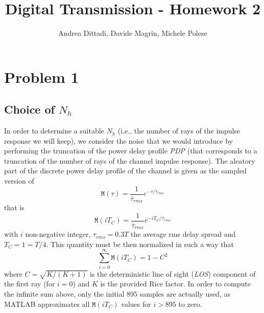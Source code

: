 \documentclass[10pt]{article}
\newcommand{\M} {\mathtt{M}}
\begin{document}
\title{Digital Transmission - Homework 2}
\author{Andrea Dittadi, Davide Magrin, Michele Polese}

\maketitle

\section*{Problem 1}

\subsection*{Choice of $N_h$}

In order to determine a suitable $N_h$ (i.e., the number of rays of the impulse response we will keep), we consider the noise that we would introduce by performing the truncation of the power delay profile \textit{PDP} (that corresponds to a truncation of the number of rays of the channel impulse response). The aleatory part of the discrete power delay profile of the channel is given as the sampled version of
\begin{equation}
\M(\tau) = \frac{1}{\bar{\tau}_{rms}} e^{-\tau / \bar{\tau}_{rms}}
\end{equation}
that is
\begin{equation}
\M(iT_C) = \frac{1}{\bar{\tau}_{rms}} e^{-iT_C / \bar{\tau}_{rms}}
\end{equation}
with $i$ non-negative integer, $\tau_{rms} = 0.3T$ the average rms delay spread and $T_C = 1 = T/4$. This quantity must be then normalized in such a way that
\begin{equation}
\sum_{i=0}^{\infty} \M(iT_C) = 1 - C^2
\end{equation}
where $C = \sqrt{K / (K+1)}$ is the deterministic line of sight (\textit{LOS}) component of the first ray (for $i=0$) and $K$ is the provided Rice factor. In order to compute the infinite sum above, only the initial 895 samples are actually used, as MATLAB approximates all $\M(iT_C)$ values for $i > 895$ to zero.
\end{document}
